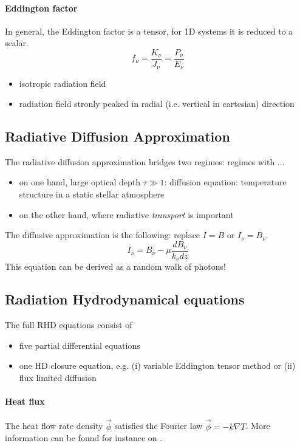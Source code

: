 \documentclass[../main/main.tex]{subfiles}
\begin{document}
\paragraph{Eddington factor}
In general, the Eddington factor is a tensor, for 1D systems it is reduced to a scalar.
\begin{equation}
f_{\nu} = \frac{K_{\nu}}{J_{\nu}} = \frac{P_{\nu}}{E_{\nu}}
\end{equation}
\begin{itemize}
\item isotropic radiation field
\item radiation field stronly peaked in radial (i.e. vertical in cartesian) direction
\end{itemize}



\subsection{Radiative Diffusion Approximation} The radiative diffusion approximation bridges two regimes: regimes with ... 
\begin{itemize}
\item on one hand, large optical depth $\tau \gg 1$: diffusion equation: temperature structure in a static stellar atmosphere
\item on the other hand, where radiative \textit{transport} is important
\end{itemize}
The diffusive approximation is the following: replace $\boxed{I = B}$ or $I_{\nu} = B_{\nu}$.
\begin{equation}
I_{\nu} = B_{\nu} - \mu \frac{dB_{\nu}}{k_{\nu}dz}
\end{equation}
This equation can be derived as a random walk of photons!


\subsection{Radiation Hydrodynamical equations}
The full RHD equations consist of 
\begin{itemize}
\item five partial differential equations
\item one HD closure equation, e.g. (i) variable Eddington tensor method or (ii) flux limited diffusion
\end{itemize}

\paragraph{Heat flux}
The heat flow rate density $\vec{\phi}$ satisfies the Fourier law $\vec{\phi} = - k\nabla T$. More information can be found for instance on \cite{WikiHeat}.
\end{document}
